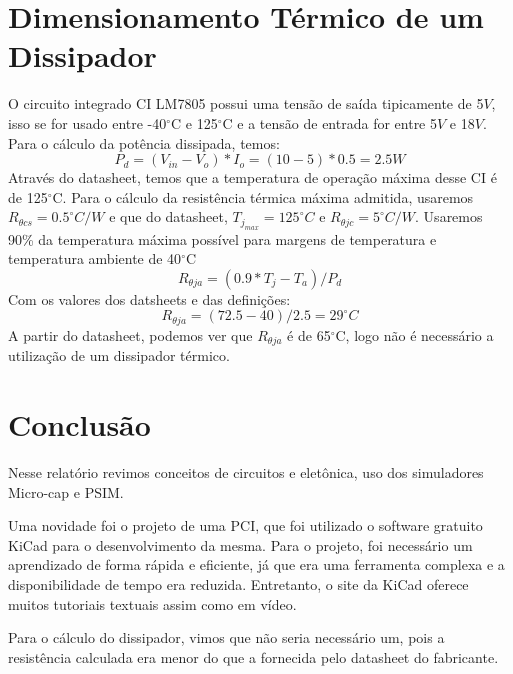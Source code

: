 \chapter{Dimensionamento Térmico de um Dissipador}

O circuito integrado CI LM7805 possui uma tensão de saída tipicamente de 5$V$, isso se for usado entre -40$^{\circ}$C e 125$^{\circ}$C e a tensão de entrada for entre 5$V$ e 18$V$. Para o cálculo da potência dissipada, temos: 
\begin{equation}
    P_{d} = (V_{in}-V_{o})*I_{o} = (10 - 5)*0.5 = 2.5W
\end{equation}
Através do datasheet, temos que a temperatura de operação máxima desse CI é de 125$^{\circ}$C. Para o cálculo da resistência térmica máxima admitida, usaremos $ R_{\theta cs} = 0.5^{\circ}C/W $ e que do datasheet\cite{datasheet}, $T_{j_{max}} = 125^{\circ}C$ e $ R_{\theta jc} = 5^{\circ}C/W$. Usaremos 90\% da temperatura máxima possível para margens de temperatura e temperatura ambiente de 40$^{\circ}$C
\begin{equation}
    R_{\theta ja} =  (0.9*T_{j} - T_{a})/P_{d}
\end{equation}
Com os valores dos datsheets e das definições:
\begin{equation}
        R_{\theta ja} =  (72.5 - 40)/2.5 = 29^{\circ}C
\end{equation}
A partir do datasheet\cite{datasheet}, podemos ver que $R_{\theta ja}$ é de 65$^{\circ}$C, logo não é necessário a utilização de um dissipador térmico.

\chapter{Conclusão}

Nesse relatório revimos conceitos de circuitos e eletônica, uso dos simuladores Micro-cap\cite{microcap} e PSIM\cite{psim}. 

Uma novidade foi o projeto de uma PCI, que foi utilizado o software gratuito KiCad\cite{kicad} para o desenvolvimento da mesma. Para o projeto, foi necessário um aprendizado de forma rápida e eficiente, já que era uma ferramenta complexa e a disponibilidade de tempo era reduzida. Entretanto, o site da KiCad oferece muitos tutoriais textuais assim como em vídeo.

Para o cálculo do dissipador, vimos que não seria necessário um, pois a resistência calculada era menor do que a fornecida pelo datasheet\cite{datasheet} do fabricante.


